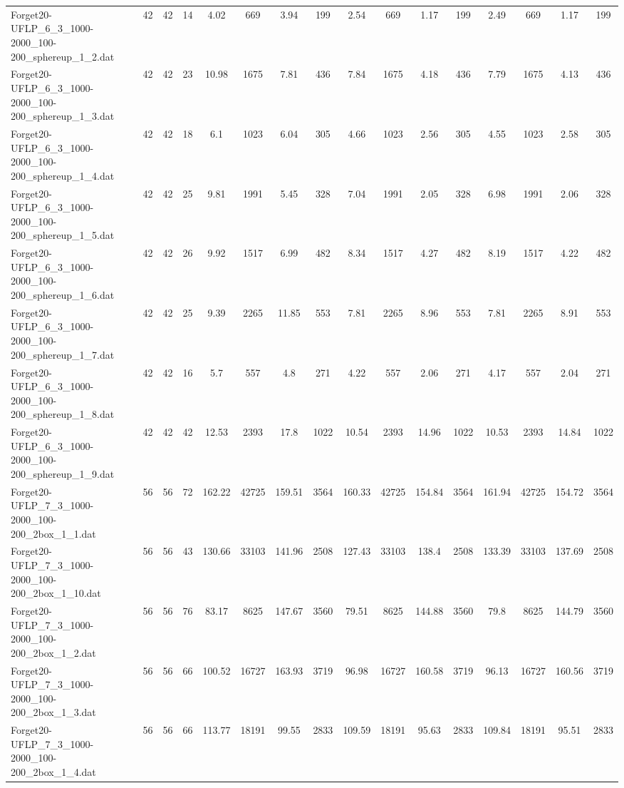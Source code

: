 \begin{sidewaystable}[!ht]
{\begin{tabular}{lccccccccccccccc}
Forget20-UFLP\_6\_3\_1000-2000\_100-200\_sphereup\_1\_2.dat & 42 & 42 & 14 & 4.02 & 669 & 3.94 & 199 & 2.54 & 669 & 1.17 & 199 & 2.49 & 669 & 1.17 & 199 \\
Forget20-UFLP\_6\_3\_1000-2000\_100-200\_sphereup\_1\_3.dat & 42 & 42 & 23 & 10.98 & 1675 & 7.81 & 436 & 7.84 & 1675 & 4.18 & 436 & 7.79 & 1675 & 4.13 & 436 \\
Forget20-UFLP\_6\_3\_1000-2000\_100-200\_sphereup\_1\_4.dat & 42 & 42 & 18 & 6.1 & 1023 & 6.04 & 305 & 4.66 & 1023 & 2.56 & 305 & 4.55 & 1023 & 2.58 & 305 \\
Forget20-UFLP\_6\_3\_1000-2000\_100-200\_sphereup\_1\_5.dat & 42 & 42 & 25 & 9.81 & 1991 & 5.45 & 328 & 7.04 & 1991 & 2.05 & 328 & 6.98 & 1991 & 2.06 & 328 \\
Forget20-UFLP\_6\_3\_1000-2000\_100-200\_sphereup\_1\_6.dat & 42 & 42 & 26 & 9.92 & 1517 & 6.99 & 482 & 8.34 & 1517 & 4.27 & 482 & 8.19 & 1517 & 4.22 & 482 \\
Forget20-UFLP\_6\_3\_1000-2000\_100-200\_sphereup\_1\_7.dat & 42 & 42 & 25 & 9.39 & 2265 & 11.85 & 553 &  \textcolor{blue2}{7.81} & 2265 & 8.96 & 553 &  \textcolor{blue2}{7.81} & 2265 & 8.91 & 553 \\
Forget20-UFLP\_6\_3\_1000-2000\_100-200\_sphereup\_1\_8.dat & 42 & 42 & 16 & 5.7 & 557 & 4.8 & 271 & 4.22 & 557 & 2.06 & 271 & 4.17 & 557 & 2.04 & 271 \\
Forget20-UFLP\_6\_3\_1000-2000\_100-200\_sphereup\_1\_9.dat & 42 & 42 & 42 & 12.53 & 2393 & 17.8 & 1022 & 10.54 & 2393 & 14.96 & 1022 & 10.53 & 2393 & 14.84 & 1022 \\
Forget20-UFLP\_7\_3\_1000-2000\_100-200\_2box\_1\_1.dat & 56 & 56 & 72 & 162.22 & 42725 & 159.51 & 3564 & 160.33 & 42725 & 154.84 & 3564 & 161.94 & 42725 & 154.72 & 3564 \\
Forget20-UFLP\_7\_3\_1000-2000\_100-200\_2box\_1\_10.dat & 56 & 56 & 43 & 130.66 & 33103 & 141.96 & 2508 & 127.43 & 33103 & 138.4 & 2508 & 133.39 & 33103 & 137.69 & 2508 \\
Forget20-UFLP\_7\_3\_1000-2000\_100-200\_2box\_1\_2.dat & 56 & 56 & 76 & 83.17 & 8625 & 147.67 & 3560 &  \textcolor{blue2}{79.51} & 8625 & 144.88 & 3560 & 79.8 & 8625 & 144.79 & 3560 \\
Forget20-UFLP\_7\_3\_1000-2000\_100-200\_2box\_1\_3.dat & 56 & 56 & 66 & 100.52 & 16727 & 163.93 & 3719 & 96.98 & 16727 & 160.58 & 3719 & 96.13 & 16727 & 160.56 & 3719 \\
Forget20-UFLP\_7\_3\_1000-2000\_100-200\_2box\_1\_4.dat & 56 & 56 & 66 & 113.77 & 18191 & 99.55 & 2833 & 109.59 & 18191 & 95.63 & 2833 & 109.84 & 18191 &  \textcolor{blue2}{95.51} & 2833 \\

\end{tabular}}
\end{sidewaystable}
